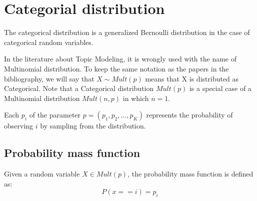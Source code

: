 \section{Categorial distribution}
The categorical distribution is a generalized Bernoulli distribution in the case of categorical random variables.

In the literature about Topic Modeling, it is wrongly used with the name of Multinomial distribution.
To keep the same notation as the papers in the bibliography, we will say that $X \sim Mult(p)$ means that X is distributed as Categorical.
Note that a Categorical distribution $Mult(p)$ is a special case of a Multinomial distribution $Mult(n, p)$ in which $n=1$.

Each $p_i$ of the parameter $p = (p_1, p_2, \dots, p_K)$ represents the probability of observing $i$ by sampling from the distribution.

\subsection{Probability mass function}
Given a random variable $X \in Mult(p)$, the probability mass function is defined as:
$$P(x == i) = p_i$$